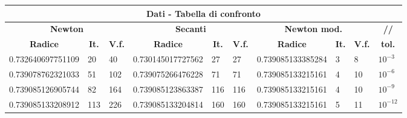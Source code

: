 \documentclass[10pt,a4paper]{article}
\begin{document}
\begin{center}
  \setlength\tabcolsep{2pt}
  \begin{tabular}{|p{3cm} | p{1cm} | p{1cm} | p{3cm} | p{1cm} | p{1cm} | p{3cm} | p{1cm} | p{1cm} | p{1cm}|}
    \hline
    \multicolumn{10}{|c|}{\textbf{Dati - Tabella di confronto}}                                                                                                                                                               \\
    \hline
    \multicolumn{3}{|c|}{\textbf{Newton}} & \multicolumn{3}{|c|}{\textbf{Secanti}} & \multicolumn{3}{|c|}{\textbf{Newton mod.}}
                                          & \multicolumn{1}{c|}{\textbf{//}}                                                                                                                                                  \\
    \hline
    \multicolumn{1}{|c|}{\textbf{Radice}} & \multicolumn{1}{|c|}{\textbf{It.}}     & \multicolumn{1}{|c|}{\textbf{V.f.}}
                                          & \multicolumn{1}{|c|}{\textbf{Radice}}  & \multicolumn{1}{|c|}{\textbf{It.}}         & \multicolumn{1}{|c|}{\textbf{V.f.}}
                                          & \multicolumn{1}{|c|}{\textbf{Radice}}  & \multicolumn{1}{|c|}{\textbf{It.}}         & \multicolumn{1}{|c|}{\textbf{V.f.}}
                                          & \multicolumn{1}{c|}{\textbf{tol.}}                                                                                                                                                \\
    \hline
    0.732640697751109                     & 20                                     & 40                                         & 0.730145017727562                   & 27  & 27  & 0.739085133385284 & 3 & 8  & $ 10^{-3} $  \\
    0.739078762321033                     & 51                                     & 102                                        & 0.739075266476228                   & 71  & 71  & 0.739085133215161 & 4 & 10 & $ 10^{-6} $  \\
    0.739085126905744                     & 82                                     & 164                                        & 0.739085123863387                   & 116 & 116 & 0.739085133215161 & 4 & 10 & $ 10^{-9} $  \\
    0.739085133208912                     & 113                                    & 226                                        & 0.739085133204814                   & 160 & 160 & 0.739085133215161 & 5 & 11 & $ 10^{-12} $ \\
    \hline
  \end{tabular}
  \newline
\end{center}
\end{document}

